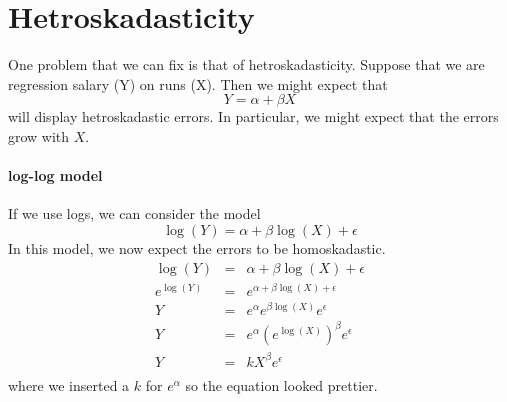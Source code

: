 \documentclass{article} %
\begin{document}
\section{Hetroskadasticity}

One problem that we can fix is that of hetroskadasticity.  Suppose
that we are regression salary (Y) on runs (X).  Then we might expect
that 
\begin{displaymath}
Y = \alpha + \beta X
\end{displaymath}
will display hetroskadastic errors.  In particular, we might expect
that the errors grow with $X$.  

\paragraph{log-log model}  If we use logs, we can consider the model
\begin{displaymath}
\log(Y) = \alpha + \beta \log(X) + \epsilon
\end{displaymath}
In this model, we now expect the errors to be homoskadastic.  
\begin{eqnarray*}
\log(Y) & = & \alpha + \beta \log(X) + \epsilon\\
e^{\log(Y)} & = & e^{\alpha + \beta \log(X) + \epsilon}\\
Y & = & e^{\alpha} e^{\beta \log(X)} e^{\epsilon}\\
Y & = & e^{\alpha} (e^{\log(X)})^\beta  e^{\epsilon}\\
Y & = & k X^\beta  e^{\epsilon}\\
\end{eqnarray*}
where we inserted a $k$ for $e^{\alpha}$ so the equation looked
prettier. 
\end{document}
